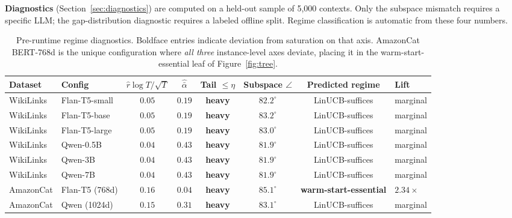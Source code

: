 \documentclass{article}
\theoremstyle{definition}
\theoremstyle{remark}
\theoremstyle{remark}
\begin{document}
\textbf{Diagnostics} (Section~\ref{sec:diagnostics}) are computed on a
held-out sample of 5{,}000 contexts. Only the subspace mismatch requires a
specific LLM; the gap-distribution diagnostic requires a labeled offline
split. Regime classification is automatic from these four numbers.

\begin{table}[h]
\centering
\caption{Pre-runtime regime diagnostics. Boldface entries indicate deviation
from saturation on that axis. AmazonCat BERT-768d is the unique configuration
where \emph{all three} instance-level axes deviate, placing it in the
warm-start-essential leaf of Figure~\ref{fig:tree}.}
\label{tab:regime-predictions}
\footnotesize
\setlength{\tabcolsep}{4pt}
\begin{tabular}{@{}llcccccl@{}}
\toprule
Dataset & Config & $\widehat r\log T/\sqrt T$ & $\widehat{\bar\alpha}$ & Tail $\le\eta$ & Subspace $\angle$ & Predicted regime & Lift \\
\midrule
WikiLinks & Flan-T5-small  & $0.05$ & $0.19$ & \textbf{heavy}  & $\mathbf{82.2^\circ}$ & LinUCB-suffices  & marginal \\
WikiLinks & Flan-T5-base   & $0.05$ & $0.19$ & \textbf{heavy}  & $\mathbf{83.2^\circ}$ & LinUCB-suffices  & marginal \\
WikiLinks & Flan-T5-large  & $0.05$ & $0.19$ & \textbf{heavy}  & $\mathbf{83.0^\circ}$ & LinUCB-suffices  & marginal \\
WikiLinks & Qwen-0.5B      & $0.04$ & $0.43$ & \textbf{heavy}  & $\mathbf{81.9^\circ}$ & LinUCB-suffices & marginal \\
WikiLinks & Qwen-3B        & $0.04$ & $0.43$ & \textbf{heavy}  & $\mathbf{81.9^\circ}$ & LinUCB-suffices & marginal \\
WikiLinks & Qwen-7B        & $0.04$ & $0.43$ & \textbf{heavy}  & $\mathbf{81.9^\circ}$ & LinUCB-suffices  & marginal \\
\midrule
AmazonCat & Flan-T5 (768d) & $\mathbf{0.16}$ & $\mathbf{0.04}$ & \textbf{heavy} & $\mathbf{85.1^\circ}$ & \textbf{warm-start-essential} & $2.34\times$ \\
AmazonCat & Qwen (1024d)   & $\mathbf{0.15}$ & $0.31$ & \textbf{heavy} & $\mathbf{83.1^\circ}$ & LinUCB-suffices & marginal \\
\bottomrule
\end{tabular}
\end{table}
\end{document}
